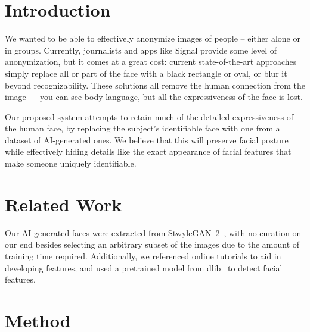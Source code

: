 \section{Introduction}


We wanted to be able to effectively anonymize images of people -- either alone or in groups. Currently, journalists and apps like Signal provide some level of anonymization, but it comes at a great cost: current state-of-the-art approaches simply replace all or part of the face with a black rectangle or oval, or blur it beyond recognizability. These solutions all remove the human connection from the image — you can see body language, but all the expressiveness of the face is lost.

Our proposed system attempts to retain much of the detailed expressiveness of the human face, by replacing the subject's identifiable face with one from a dataset of AI-generated ones. We believe that this will preserve facial posture while effectively hiding details like the exact appearance of facial features that make someone uniquely identifiable.

\section{Related Work}


Our AI-generated faces were extracted from StwyleGAN~2~\cite{Karras2019stylegan2}, with no curation on our end besides selecting an arbitrary subset of the images due to the amount of training time required. Additionally, we referenced online tutorials \cite{serengil_2021}\cite{there_2019} to aid in developing features, and used a pretrained model from dlib~\cite{guoquanhao_2019} to detect facial features.

\section{Method}

